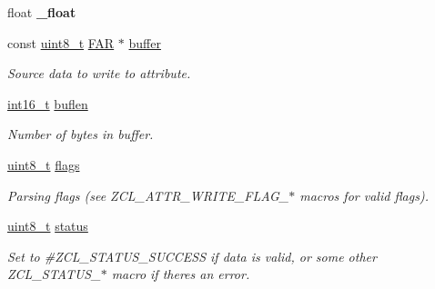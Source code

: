 \begin{DoxyCompactItemize}
\item 
\mbox{\label{group__zcl_ga552109c4aeafc45875faff0313ae8202}} 
float {\bfseries \+\_\+float}
\item 
\mbox{\label{group__zcl_ga669940d05e1abc9807300f7d34169496}} 
const \hyperlink{group__hal__dos_gae1affc9ca37cfb624959c866a73f83c2}{uint8\+\_\+t} \hyperlink{group__hal_gaef060b3456fdcc093a7210a762d5f2ed}{F\+AR} $\ast$ \hyperlink{group__zcl_ga669940d05e1abc9807300f7d34169496}{buffer}
\begin{DoxyCompactList}\small\item\em Source data to write to attribute. \end{DoxyCompactList}\item 
\mbox{\label{group__zcl_ga0d88b9a4d20f93d09002c72ef71cf861}} 
\hyperlink{group__hal__dos_ga2140805d08462d474b82ddc8d1c2f3e6}{int16\+\_\+t} \hyperlink{group__zcl_ga0d88b9a4d20f93d09002c72ef71cf861}{buflen}
\begin{DoxyCompactList}\small\item\em Number of bytes in {\ttfamily buffer}. \end{DoxyCompactList}\item 
\mbox{\label{group__zcl_gaa2585d779da0ab21273a8d92de9a0ebe}} 
\hyperlink{group__hal__dos_gae1affc9ca37cfb624959c866a73f83c2}{uint8\+\_\+t} \hyperlink{group__zcl_gaa2585d779da0ab21273a8d92de9a0ebe}{flags}
\begin{DoxyCompactList}\small\item\em Parsing flags (see Z\+C\+L\+\_\+\+A\+T\+T\+R\+\_\+\+W\+R\+I\+T\+E\+\_\+\+F\+L\+A\+G\+\_\+$\ast$ macros for valid flags). \end{DoxyCompactList}\item 
\hyperlink{group__hal__dos_gae1affc9ca37cfb624959c866a73f83c2}{uint8\+\_\+t} \hyperlink{group__zcl_gade818037fd6c985038ff29656089758d}{status}
\begin{DoxyCompactList}\small\item\em Set to \#\+Z\+C\+L\+\_\+\+S\+T\+A\+T\+U\+S\+\_\+\+S\+U\+C\+C\+E\+SS if data is valid, or some other Z\+C\+L\+\_\+\+S\+T\+A\+T\+U\+S\+\_\+$\ast$ macro if there\textquotesingle{}s an error. \end{DoxyCompactList}\item 
\mbox{\label{group__zcl_ga4fc3a0c58dfbd1e68224521185cb9384}} 

\end{DoxyCompactItemize}
